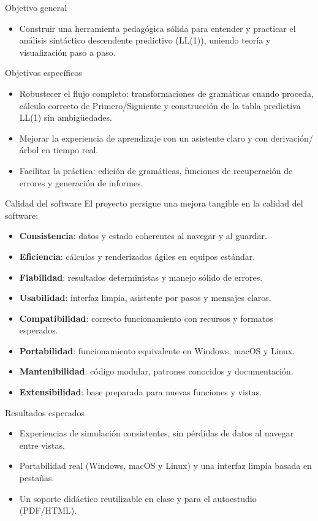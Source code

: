 \begin{frame}{Objetivo general}
  \begin{itemize}
    \item Construir una herramienta pedagógica sólida para entender y practicar el análisis sintáctico descendente predictivo (LL(1)), uniendo teoría y visualización paso a paso.
  \end{itemize}
\end{frame}

\begin{frame}{Objetivos específicos}
  \begin{itemize}
    \item Robustecer el flujo completo: transformaciones de gramáticas cuando proceda, cálculo correcto de Primero/Siguiente y construcción de la tabla predictiva LL(1) sin ambigüedades.
    \item Mejorar la experiencia de aprendizaje con un asistente claro y con derivación/árbol en tiempo real.
    \item Facilitar la práctica: edición de gramáticas, funciones de recuperación de errores y generación de informes.
  \end{itemize}
\end{frame}

\begin{frame}{Calidad del software}
  El proyecto persigue una mejora tangible en la calidad del software:
  \begin{itemize}
    \item \textbf{Consistencia}: datos y estado coherentes al navegar y al guardar.
    \item \textbf{Eficiencia}: cálculos y renderizados ágiles en equipos estándar.
    \item \textbf{Fiabilidad}: resultados deterministas y manejo sólido de errores.
    \item \textbf{Usabilidad}: interfaz limpia, asistente por pasos y mensajes claros.
    \item \textbf{Compatibilidad}: correcto funcionamiento con recursos y formatos esperados.
    \item \textbf{Portabilidad}: funcionamiento equivalente en Windows, macOS y Linux.
    \item \textbf{Mantenibilidad}: código modular, patrones conocidos y documentación.
    \item \textbf{Extensibilidad}: base preparada para nuevas funciones y vistas.
  \end{itemize}
\end{frame}

\begin{frame}{Resultados esperados}
  \begin{itemize}
    \item Experiencias de simulación consistentes, sin pérdidas de datos al navegar entre vistas.
    \item Portabilidad real (Windows, macOS y Linux) y una interfaz limpia basada en pestañas.
    \item Un soporte didáctico reutilizable en clase y para el autoestudio (PDF/HTML).
  \end{itemize}
\end{frame}


